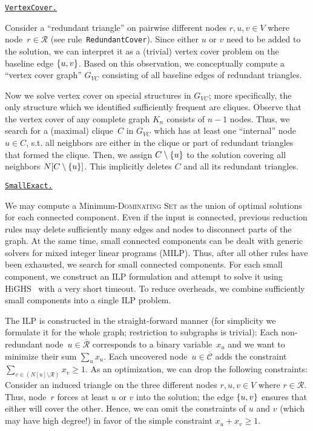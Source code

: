 \documentclass[a4paper, USenglish, cleveref, autoref, thm-restate, noalgorithm2e]{socg-lipics-v2021}
\newcommand{\set}[1]{\ensuremath\left\{#1\right\}}
\newcommand{\Dom}{\textsc{Dominating Set}\xspace}
\newcommand{\red}{\ensuremath{\mathcal R}\xspace}
\newcommand{\ccov}{\ensuremath{\overline{\mathcal C}}\xspace}
\newcommand{\cred}{\ensuremath{\overline{\mathcal R}}\xspace}
\newcommand{\Rule}[1]{{\texttt{#1}}}
\def\defrule#1{%
    \medskip
    
    \noindent
    \underline{\texttt{#1.}}
}
\begin{document}
\defrule{VertexCover}
Consider a ``redundant triangle'' on pairwise different nodes $r, u, v \in V$ where node~$r \in \red$ (see rule~\Rule{RedundantCover}).
Since either $u$ or $v$ need to be added to the solution, we can interpret it as a (trivial) vertex cover problem on the baseline edge $\set{u,v}$.
Based on this observation, we conceptually compute a ``vertex cover graph'' $G_{VC}$ consisting of all baseline edges of redundant triangles.

Now we solve vertex cover on special structures in $G_{VC}$; more specifically, the only structure which we identified sufficiently frequent are cliques.
Observe that the vertex cover of any complete graph $K_n$ consists of $n-1$ nodes.
Thus, we search for a (maximal) clique~$C$ in $G_{VC}$ which has at least one ``internal'' node~$u \in C$, s.t. all neighbors are either in the clique or part of redundant triangles that formed the clique.
Then, we assign $C \setminus \set{u}$ to the solution covering all neighbors $N[C \setminus \set{u}]$.
This implicitly deletes $C$ and all its redundant triangles.

\defrule{SmallExact}
We may compute a Minimum-\Dom as the union of optimal solutions for each connected component.
Even if the input is connected, previous reduction rules may delete sufficiently many edges and nodes to disconnect parts of the graph.
At the same time, small connected components can be dealt with generic solvers for mixed integer linear programs (MILP).
Thus, after all other rules have been exhausted, we search for small connected components.
For each small component, we construct an ILP formulation and attempt to solve it using HiGHS~\cite{highs} with a very short timeout.
To reduce overheads, we combine sufficiently small components into a single ILP problem.

The ILP is constructed in the straight-forward manner (for simplicity we formulate it for the whole graph; restriction to subgraphs is trivial):
Each non-redundant node~$u \in \cred$ corresponds to a binary variable~$x_u$ and we want to minimize their sum $\sum_u x_u$.
Each uncovered node~$u \in \ccov$ adds the constraint $\sum_{v \in (N[u] \setminus \red)} x_v \ge 1$.
%
As an optimization, we can drop the following constraints:
Consider an induced triangle on the three different nodes $r, u, v \in V$ where $r \in \red$.
Thus, node~$r$ forces at least $u$ or $v$ into the solution; the edge $\set{u,v}$ ensures that either will cover the other.
Hence, we can omit the constraints of $u$ and $v$ (which may have high degree!) in favor of the simple constraint $x_u + x_v \ge 1$.
\end{document}
